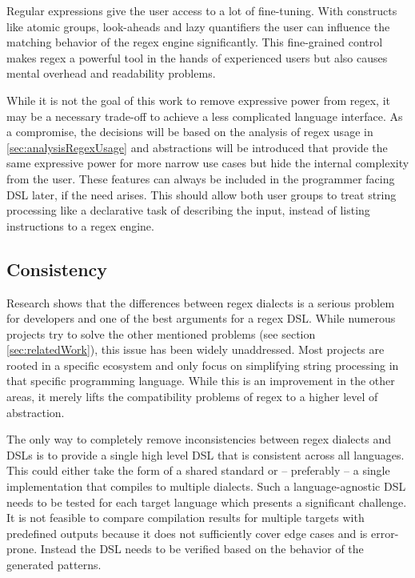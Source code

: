 Regular expressions give the user access to a lot of fine-tuning. With constructs like atomic groups, look-aheads and lazy quantifiers the user can influence the matching behavior of the regex engine significantly. This fine-grained control makes regex a powerful tool in the hands of experienced users but also causes mental overhead and readability problems. 

While it is not the goal of this work to remove expressive power from regex, it may be a necessary trade-off to achieve a less complicated language interface. As a compromise, the decisions will be based on the analysis of regex usage in \ref{sec:analysisRegexUsage}
and abstractions will be introduced that provide the same expressive power for more narrow use cases but hide the internal complexity from the user. These features can always be included in the programmer facing DSL later, if the need arises. This should allow both user groups to treat string processing like a declarative task of describing the input, instead of listing instructions to a regex engine.

\subsection{Consistency}

Research shows that the differences between regex dialects is a serious problem for developers \cite{RegexNotLinguaFranca} and one of the best arguments for a regex DSL. While numerous projects try to solve the other mentioned problems (see section \ref{sec:relatedWork}), this issue has been widely unaddressed.
Most projects are rooted in a specific ecosystem and only focus on simplifying string processing in that specific programming language. While this is an improvement in the other areas, it merely lifts the compatibility problems of regex to a higher level of abstraction.

The only way to completely remove inconsistencies between regex dialects and DSLs is to provide a single high level DSL that is consistent across all languages. This could either take the form of a shared standard or -- preferably -- a single implementation that compiles to multiple dialects. Such a language-agnostic DSL needs to be tested for each target language which presents a significant challenge. 
It is not feasible to compare compilation results for multiple targets with predefined outputs because it does not sufficiently cover edge cases and is error-prone. Instead the DSL needs to be verified based on the behavior of the generated patterns.

